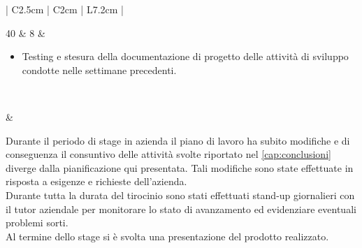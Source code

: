 \begin{center}
\begin{longtable}{| C{2.5cm} | C{2cm} | L{7.2cm} | }
			\hline
			
			40 & 8 &
			\begin{itemize}[leftmargin=*]
				\item Testing e stesura della documentazione di progetto delle attività di sviluppo condotte nelle settimane precedenti.
			\end{itemize} \\
			
			\hline
			
			 & 	\\
			
			\hline
		
			
			\caption{Pianificazione delle attività}\label{tab:pianificazione}
		\end{longtable}
		
	
\end{center}
Durante il periodo di stage in azienda il piano di lavoro ha subito modifiche e di conseguenza il consuntivo delle attività svolte riportato nel \autoref{cap:conclusioni} diverge dalla pianificazione qui presentata. Tali modifiche sono state effettuate in risposta a esigenze e richieste dell'azienda. \\
Durante tutta la durata del tirocinio sono stati effettuati stand-up giornalieri con il tutor aziendale per 
monitorare lo stato di avanzamento ed evidenziare eventuali problemi sorti. \\
Al termine dello stage si è svolta una presentazione del prodotto realizzato.
